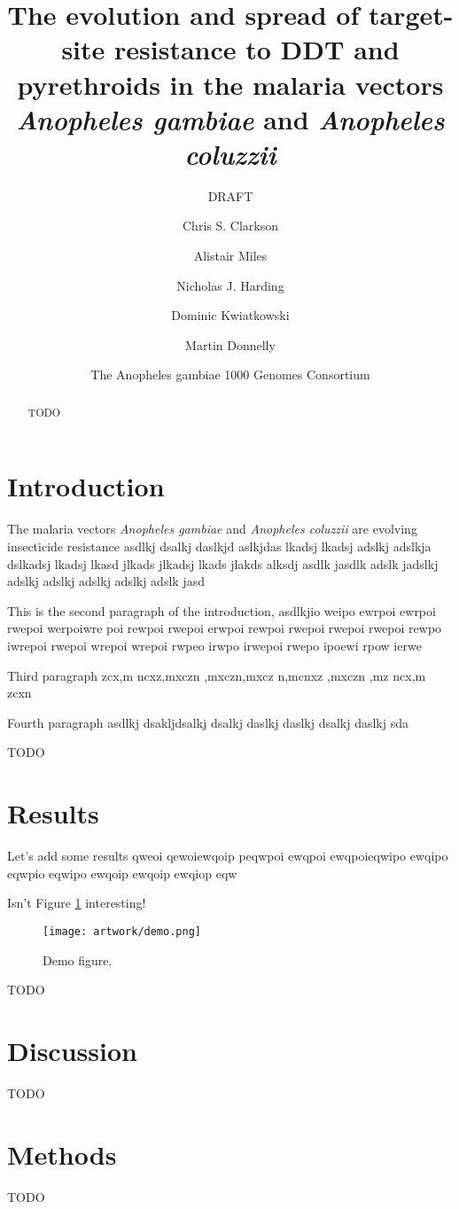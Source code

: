 \documentclass[a4paper,10pt,abstracton]{scrartcl}
\title{The evolution and spread of target-site resistance to DDT and pyrethroids in the malaria vectors \emph{Anopheles gambiae} and \emph{Anopheles coluzzii}}
\subtitle{DRAFT}
\author{
	Chris S. Clarkson
	\and 
	Alistair Miles
	\and
	Nicholas J. Harding
	\and
	Dominic Kwiatkowski
	\and
	Martin Donnelly
	\and
	The Anopheles gambiae 1000 Genomes Consortium
}
\begin{document}
\maketitle

\begin{abstract}

TODO

\end{abstract}

\section*{Introduction}

The malaria vectors \emph{Anopheles gambiae} and \emph{Anopheles coluzzii} are evolving insecticide resistance asdlkj dsalkj daslkjd aslkjdas lkadsj lkadsj adslkj 
adslkja dslkadsj lkadsj lkasd jlkads jlkadsj lkads jlakds alksdj asdlk jasdlk adslk jadslkj adslkj adslkj adslkj adslkj adslk jasd

This is the second paragraph of the introduction, asdlkjio weipo ewrpoi ewrpoi rwepoi werpoiwre poi rewpoi rwepoi erwpoi rewpoi rwepoi rwepoi rwepoi rewpo iwrepoi rwepoi wrepoi 
wrepoi rwpeo irwpo irwepoi rwepo ipoewi rpow ierwe

Third paragraph zcx,m ncxz,mxczn ,mxczn,mxcz n,mcnxz ,mxczn ,mz ncx,m zcxn

Fourth paragraph asdlkj dsakljdsalkj dsalkj daslkj daslkj dsalkj daslkj sda

TODO

\section*{Results}

Let's add some results qweoi qewoiewqoip peqwpoi ewqpoi ewqpoieqwipo ewqipo eqwpio eqwipo ewqoip ewqoip ewqiop eqw

Isn't Figure \ref{fig:demo} interesting!

\begin{figure}[t!]
  \texttt{[image: artwork/demo.png]}
  \caption{Demo figure.}
  \label{fig:demo}
\end{figure}

TODO

\section*{Discussion}

TODO

\section*{Methods}

TODO
\end{document}
